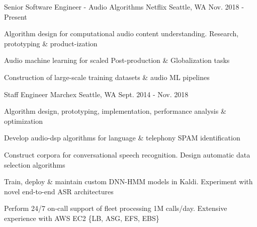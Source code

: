 

\begin{cventries}

  \cventry
    {Senior Software Engineer - Audio Algorithms} %
    {Netflix} %
    {Seattle, WA} %
    {Nov. 2018 - Present} %
    {
      \begin{cvitems} %
        \item {Algorithm design for computational audio content understanding. Research, prototyping \& product-ization}
        \item {Audio machine learning for scaled Post-production \& Globalization tasks}
        \item {Construction of large-scale training datasets \& audio ML pipelines}
      \end{cvitems}
    }


  \cventry
    {Staff Engineer} %
    {Marchex} %
    {Seattle, WA} %
    {Sept. 2014 - Nov. 2018} %
    {
      \begin{cvitems} %
        \item {Algorithm design, prototyping, implementation, performance analysis \& optimization}
        \item {Develop audio-dsp algorithms for language \& telephony SPAM identification}
        \item {Construct corpora for conversational speech recognition. Design automatic data selection algorithms}
        \item {Train, deploy \& maintain custom DNN-HMM models in Kaldi. Experiment with novel end-to-end ASR architectures}
        \item {Perform 24/7 on-call support of fleet processing 1M calls/day. Extensive experience with AWS EC2 \{LB, ASG, EFS, EBS\}}
      \end{cvitems}
    }


\end{cventries}
